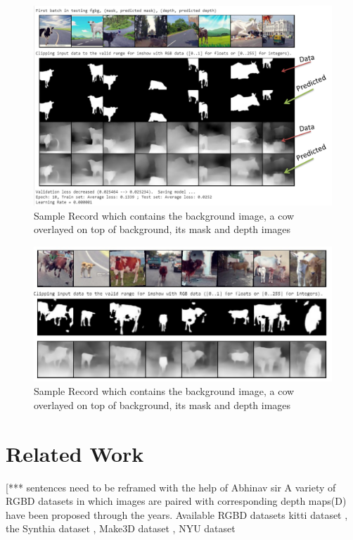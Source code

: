 \documentclass{article}
\begin{document}
\begin{figure}[h!]
\centering
  \includegraphics[width=1\textwidth]{finalepoch.png}
  \caption{Sample Record which contains the background image, a cow overlayed on top of background, its mask and depth images}
  \label{fig:samplerecord}
\end{figure}


\begin{figure}[h!]
\centering
  \includegraphics[width=1\textwidth]{unseen.jpeg}
  \caption{Sample Record which contains the background image, a cow overlayed on top of background, its mask and depth images}
  \label{fig:samplerecord}
\end{figure}


\section {Related Work}
[*** sentences need to be reframed with the help of Abhinav sir
A variety of RGBD datasets in which images are paired with corresponding depth maps(D) have been proposed through the years.
Available RGBD datasets
kitti dataset \cite{geiger2013vision}, the Synthia dataset \cite{ros2016synthia}, Make3D dataset \cite{saxena2008make3d}, NYU dataset \cite{silberman2012indoor}
\end{document}
